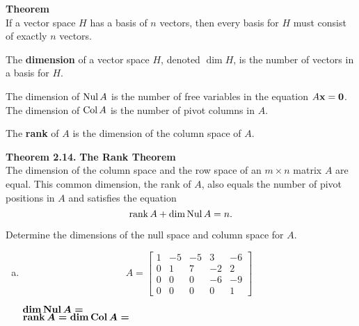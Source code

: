 \vfill

\begin{boxthm}
	\textbf{Theorem} \\
	If a vector space $H$ has a basis of $n$ vectors, then every basis for $H$ must consist of exactly $n$ vectors.
\end{boxthm}
\vspace{-1em}
\begin{boxdef}
	The \textbf{dimension} of a vector space $H$, denoted $\dim H$, is the number of vectors in a basis for $H$.
\end{boxdef}

\begin{boxme}
	The dimension of $\operatorname{Nul} A$ is the number of free variables in the equation $A\boldsymbol{\mathbf{x}}=\boldsymbol{\mathbf{0}}$. \\
	The dimension of $\operatorname{Col} A$ is the number of pivot columns in $A$.
\end{boxme}


\newpage

\begin{boxdef}
	The \textbf{rank} of $A$ is the dimension of the column space of $A$.
\end{boxdef}

\begin{boxthm}
	\textbf{Theorem 2.14.}
	\textbf{The Rank Theorem} \\
	The dimension of the column space and the row space of an $m\times n$ matrix $A$ are equal. This common dimension, the rank of $A$, also equals the number of pivot positions in $A$ and satisfies the equation
	\vspace{-1em}
	$$ \operatorname{rank} A + \dim\operatorname{Nul} A = n. $$
\end{boxthm}


\begin{exercise} %
	Determine the dimensions of the null space and column space for $A$.
	\begin{multicols}{2}
	\begin{enumerate}[(a)]
		\item $$A=\begin{bmatrix}1&-5&-5&3&-6\\0&1&7&-2&2\\0&0&0&-6&-9\\0&0&0&0&1\end{bmatrix}$$
		\vfill
		
		$\boldsymbol{\dim\operatorname{Nul} A=}$ \\[1em]
		$\boldsymbol{\operatorname{rank} A = \dim\operatorname{Col} A=}$

	\end{enumerate}
	\end{multicols}
\end{exercise}
\vfill


